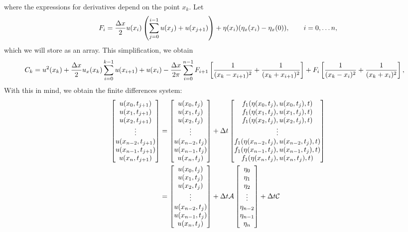 \documentclass[10pt,reqno,oneside,a4paper, landscape]{article}
\begin{document}
where the expressions for derivatives depend on the point $x_k.$ Let 
\[ 
F_i = \frac{\Delta x}{2}u(x_{i}) \left(\sum^{i-1}_{j=0} u(x_j)+u(x_{j+1}) \right) + \eta(x_{i})(\eta_x(x_{i}) - \eta_x(0)), \qquad i = 0, \ldots n,
\] 
which we will store as an array. This simplification, we obtain 
\begin{align*}
C_k &= u^2(x_k) + \frac{\Delta x}{2}  u_{x}(x_k) \sum^{k-1}_{i=0} u(x_{i+1}) + u(x_i) -\frac{\Delta x}{2\pi} \sum^{n-1}_{i=0} F_{i+1} \left[ \frac{1}{(x_k-x_{i+1})^2} + \frac{1}{(x_k+x_{i+1})^2} \right] + F_{i} \left[ \frac{1}{(x_k-x_{i})^2} + \frac{1}{(x_k+x_{i})^2} \right],
\end{align*}
With this in mind, we obtain the finite differences system:
\begin{align*}
\begin{bmatrix}
u(x_0, t_{j+1}) \\
u(x_1, t_{j+1}) \\
u(x_2, t_{j+1}) \\
\vdots \\
u(x_{n-2}, t_{j+1}) \\
u(x_{n-1}, t_{j+1}) \\
u(x_n, t_{j+1}) 
\end{bmatrix} 
&= 
\begin{bmatrix}
u(x_0, t_{j}) \\
u(x_1, t_{j}) \\
u(x_2, t_{j}) \\
\vdots \\
u(x_{n-2}, t_{j}) \\
u(x_{n-1}, t_{j}) \\
u(x_n, t_{j}) 
\end{bmatrix} 
+ \Delta t 
\begin{bmatrix}
f_1(\eta(x_0, t_j), u(x_0, t_j), t)\\
f_1(\eta(x_1, t_j), u(x_1, t_j), t) \\
 f_1(\eta(x_2, t_j), u(x_2, t_j), t) \\
\vdots \\
f_1(\eta(x_{n-2}, t_j), u(x_{n-2}, t_j), t)\\
f_1(\eta(x_{n-1}, t_j), u(x_{n-1}, t_j), t) \\
f_1(\eta(x_n, t_j), u(x_n, t_j), t) 
\end{bmatrix} \\
&= 
\begin{bmatrix}
u(x_0, t_{j}) \\
u(x_1, t_{j}) \\
u(x_2, t_{j}) \\
\vdots \\
u(x_{n-2}, t_{j}) \\
u(x_{n-1}, t_{j}) \\
u(x_n, t_{j}) 
\end{bmatrix} 
+ \Delta t \mathcal{A} \begin{bmatrix}
\eta_0 \\
\eta_1 \\
\eta_2 \\
\vdots \\
\eta_{n-2} \\
\eta_{n-1} \\
\eta_{n}
\end{bmatrix}
+ \Delta t \mathcal{C}
\end{align*}
\end{document}
